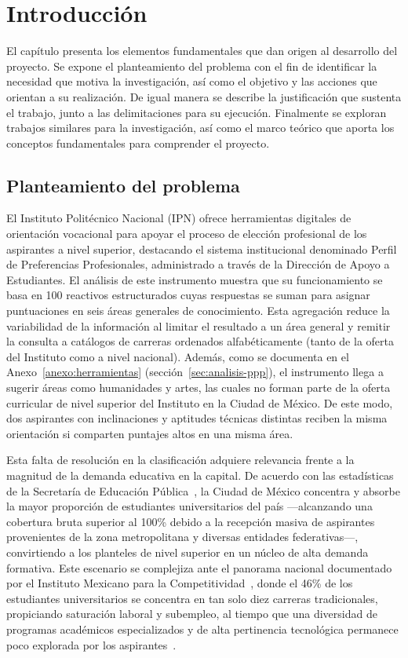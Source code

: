﻿\chapter{Introducción}
El capítulo presenta los elementos fundamentales que dan origen al desarrollo del proyecto.
Se expone el planteamiento del problema con el fin de identificar la necesidad que motiva la investigación,
así como el objetivo y las acciones que orientan a su realización. 
De igual manera se describe la justificación que sustenta el trabajo, junto a las delimitaciones para su ejecución. 
Finalmente se exploran trabajos similares para la investigación, así como el marco teórico que aporta los conceptos fundamentales para comprender el proyecto.  

\section{Planteamiento del problema}
El Instituto Politécnico Nacional (IPN) ofrece herramientas digitales de orientación vocacional para apoyar el proceso de elección profesional de los aspirantes a nivel superior, destacando el sistema institucional denominado Perfil de Preferencias Profesionales, administrado a través de la Dirección de Apoyo a Estudiantes. El análisis de este instrumento muestra que su funcionamiento se basa en 100 reactivos estructurados cuyas respuestas se suman para asignar puntuaciones en seis áreas generales de conocimiento. Esta agregación reduce la variabilidad de la información al limitar el resultado a un área general y remitir la consulta a catálogos de carreras ordenados alfabéticamente (tanto de la oferta del Instituto como a nivel nacional). Además, como se documenta en el Anexo~\ref{anexo:herramientas} (sección~\ref{sec:analisis-ppp}), el instrumento llega a sugerir áreas como humanidades y artes, las cuales no forman parte de la oferta curricular de nivel superior del Instituto en la Ciudad de México. De este modo, dos aspirantes con inclinaciones y aptitudes técnicas distintas reciben la misma orientación si comparten puntajes altos en una misma área.

Esta falta de resolución en la clasificación adquiere relevancia frente a la magnitud de la demanda educativa en la capital. De acuerdo con las estadísticas de la Secretaría de Educación Pública~\cite{SEP2026Cifras}, la Ciudad de México concentra y absorbe la mayor proporción de estudiantes universitarios del país —alcanzando una cobertura bruta superior al 100\% debido a la recepción masiva de aspirantes provenientes de la zona metropolitana y diversas entidades federativas—, convirtiendo a los planteles de nivel superior en un núcleo de alta demanda formativa. Este escenario se complejiza ante el panorama nacional documentado por el Instituto Mexicano para la Competitividad~\cite{IMCO2026}, donde el 46\% de los estudiantes universitarios se concentra en tan solo diez carreras tradicionales, propiciando saturación laboral y subempleo, al tiempo que una diversidad de programas académicos especializados y de alta pertinencia tecnológica permanece poco explorada por los aspirantes~\cite{GarciaMartinez2021}.

